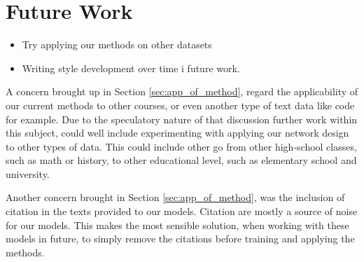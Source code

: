\section{Future Work} \label{sec:future_work}


\begin{itemize}

    \item Try applying our methods on other datasets
    \item Writing style development over time i future work.

\end{itemize}

A concern brought up in Section \ref{sec:app_of_method}, regard the
applicability of our current methods to other courses, or even another type
of text data like code for example. Due to the speculatory nature of that
discussion further work within this subject, could well include experimenting
with applying our network design to other types of data. This could include
other go from other high-school classes, such as math or history, to other
educational level, such as elementary school and university.

Another concern brought in Section \ref{sec:app_of_method}, was the inclusion of
citation in the texts provided to our models. Citation are mostly a source of
noise for our models. This makes the most sensible solution, when working with
these models in future, to simply remove the citations before training and
applying the methods. 

